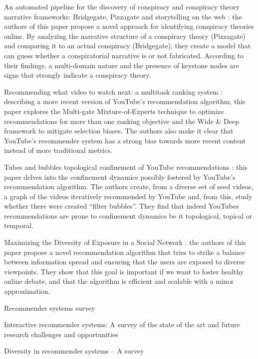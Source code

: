 An automated pipeline for the discovery of conspiracy and conspiracy theory
narrative frameworks: Bridgegate, Pizzagate and storytelling on the web
\citet{tangherlini_automated_2020}: the authors of this paper propose a novel
approach for identifying conspiracy theories online. By analyzing the narrative
structure of a conspiracy theory (Pizzagate) and comparing it to an actual
conspiracy (Bridgegate), they create a model that can guess whether a
conspiratorial narrative is or not fabricated. According to their findings,
a multi-domain nature and the presence of keystone nodes are signs that strongly
indicate a conspiracy theory.

Recommending what video to watch next: a multitask ranking system
\citet{zhao_recommending_2019}: describing a more recent version of YouTube's
recommendation algorithm, this paper explores the Multi-gate Mixture-of-Experts
technique to optimize recommendations for more than one ranking objective and
the Wide \& Deep framework to mitigate selection biases. The authors also make
it clear that YouTube's recommender system has a strong bias towards more recent
content instead of more traditional metrics.

Tubes and bubbles topological confinement of YouTube recommendations
\citet{roth_tubes_2020}: this paper delves into the confinement dynamics
possibly fostered by YouTube's recommendation algorithm. The authors create,
from a diverse set of seed videos, a graph of the videos iteratively recommended
by YouTube and, from this, study whether there were created ``filter bubbles''.
They find that indeed YouTubes recommendations are prone to confinement dynamics
be it topological, topical or temporal.

Maximizing the Diversity of Exposure in a Social Network
\citet{matakos_maximizing_2020}: the authors of this paper propose a novel
recommendation algorithm that tries to strike a balance between information
spread and ensuring that the users are exposed to diverse viewpoints. They show
that this goal is important if we want to foster healthy online debate, and that
the algorithm is efficient and scalable with a minor approximation.


Recommender systems survey \citet{bobadilla_recommender_2013}

Interactive recommender systems: A survey of the state of the art and future
research challenges and opportunities \citet{he_interactive_2016}

Diversity in recommender systems – A survey \citet{kunaver_diversity_2017}
